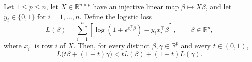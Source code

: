 \begin{theorem}
Let $1\le p\le n$, let $X\in\mathbb R^{n\times p}$ have an injective
linear map $\beta\mapsto X\beta$, and let $y_i\in\{0,1\}$ for
$i=1,\ldots,n$.  Define the logistic loss
\[
  L(\beta)=\sum_{i=1}^n
  \left[\log\!\left(1+e^{x_i^\top\beta}\right)
        -y_i x_i^\top\beta\right],
  \qquad \beta\in\mathbb R^p,
\]
where $x_i^\top$ is row $i$ of $X$.  Then, for every distinct
$\beta,\gamma\in\mathbb R^p$ and every $t\in(0,1)$,
\[
  L\bigl(t\beta+(1-t)\gamma\bigr)
  <tL(\beta)+(1-t)L(\gamma).
\]
\end{theorem}
